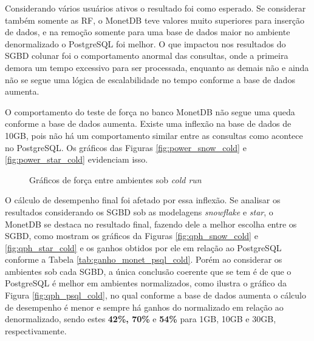 Considerando vários usuários ativos o resultado foi como esperado. Se considerar também somente as RF, o MonetDB teve valores muito superiores para inserção de dados, e na remoção somente para uma base de dados maior no ambiente denormalizado o PostgreSQL foi melhor. O que impactou nos resultados do SGBD colunar foi o comportamento anormal das consultas, onde a primeira demora um tempo excessivo para ser processada, enquanto as demais não e ainda não se segue uma lógica de escalabilidade no tempo conforme a base de dados aumenta.

O comportamento do teste de força no banco MonetDB não segue uma queda conforme a base de dados aumenta. Existe uma inflexão na base de dados de 10GB, pois não há um comportamento similar entre as consultas como acontece no PostgreSQL. Os gráficos das Figuras \ref{fig:power_snow_cold} e \ref{fig:power_star_cold} evidenciam isso. 

\begin{figure}[htpb]
        \centering
        \caption{Gráficos de força entre ambientes sob \textit{cold run}}
        \label{fig:power_cold}
\end{figure}

O cálculo de desempenho final foi afetado por essa inflexão. Se analisar os resultados considerando os SGBD sob as modelagens \textit{snowflake} e \textit{star}, o MonetDB se destaca no resultado final, fazendo dele a melhor escolha entre os SGBD, como mostram os gráficos da Figuras \ref{fig:qph_snow_cold} e \ref{fig:qph_star_cold} e os ganhos obtidos por ele em relação ao PostgreSQL conforme a Tabela \ref{tab:ganho_monet_psql_cold}. Porém ao considerar os ambientes sob cada SGBD, a única conclusão coerente que se tem é de que o PostgreSQL é melhor em ambientes normalizados, como ilustra o gráfico da Figura \ref{fig:qph_psql_cold}, no qual conforme a base de dados aumenta o cálculo de desempenho é menor e sempre há ganhos do normalizado em relação ao denormalizado, sendo estes \textbf{42\%, 70\%} e \textbf{54\%} para 1GB, 10GB e 30GB, respectivamente.

